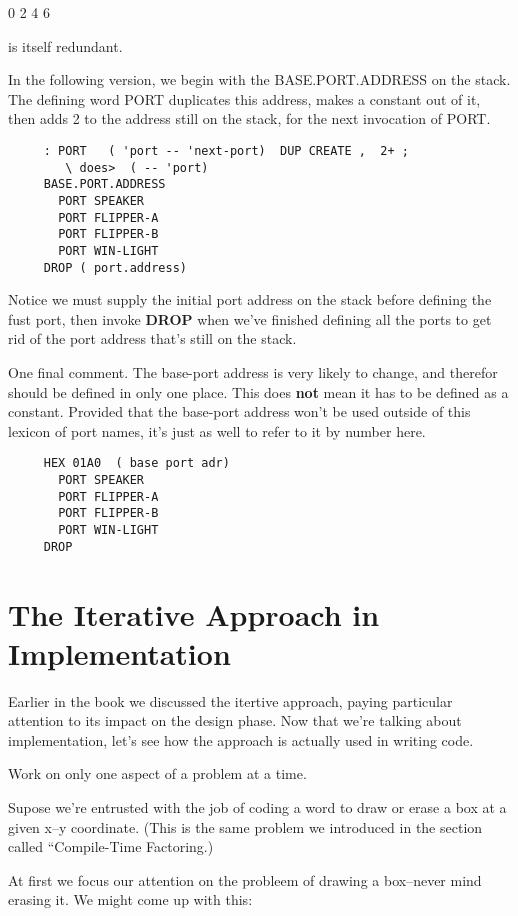 \medskip

0 2 4 6

\medskip

\noindent
is itself redundant.

In the following version, we begin with the BASE.PORT.ADDRESS on the stack. The defining word PORT duplicates this address, makes a constant out of it, then adds 2 to the address still on the stack, for the next invocation of PORT.

\begin{verbatim}
     : PORT   ( 'port -- 'next-port)  DUP CREATE ,  2+ ;
        \ does>  ( -- 'port)
     BASE.PORT.ADDRESS
       PORT SPEAKER
       PORT FLIPPER-A
       PORT FLIPPER-B
       PORT WIN-LIGHT
     DROP ( port.address)
\end{verbatim}
Notice we must supply the initial port address on the stack before defining the fust port, then invoke \textbf{DROP} when we've finished defining all the ports to get rid of the port address that's still on the stack.

One final comment. The base-port address is very likely to change, and therefor should be defined in only one place. This does \textbf{not} mean it has to be defined as a constant. Provided that the base-port address won't be used outside of this lexicon of port names, it's just as well to refer to it by number here.

\begin{verbatim}
     HEX 01A0  ( base port adr)
       PORT SPEAKER
       PORT FLIPPER-A
       PORT FLIPPER-B
       PORT WIN-LIGHT
     DROP
\end{verbatim}

\section{{{{The Iterative Approach in Implementation}}}}
Earlier in the book we discussed the itertive approach, paying particular attention to its impact on the design phase. Now that we're talking about implementation, let's see how the approach is actually used in writing code.

\begin{tip}
Work on only one aspect of a problem at a time.
\end{tip}
Supose we're entrusted with the job of coding a word to draw or erase a box at a given x--y coordinate. (This is the same problem we introduced in the section called ``Compile-Time Factoring.)

At first we focus our attention on the probleem of drawing a box--never mind erasing it. We might come up with this:

